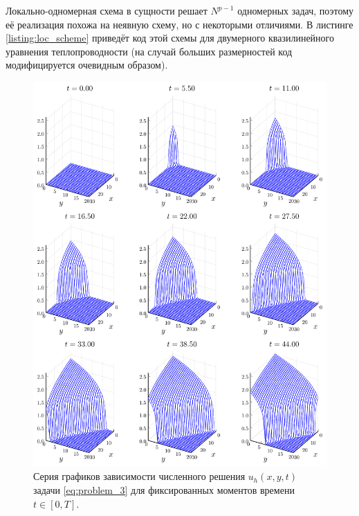 Локально-одномерная схема в сущности решает $N^{p - 1}$ одномерных задач, поэтому её реализация похожа на неявную схему, но с некоторыми отличиями.
В листинге \ref{listing:loc_scheme} приведёт код этой схемы для двумерного квазилинейного уравнения теплопроводности (на случай больших размерностей код модифицируется очевидным образом).

\begin{figure}
    \centering
    \includegraphics[width=\textwidth, keepaspectratio]{Разностные_схемы_на_статических_сетках/Программный_код_примеры_расчётов/explicit_scheme/problem_3_loc_wireframe.pdf}
    \caption{Серия графиков зависимости численного решения $u_h(x, y, t)$ задачи \eqref{eq:problem_3} для фиксированных моментов времени $t \in [0, T]$.}
    \label{fig:problem_3_wireframe}
\end{figure}

